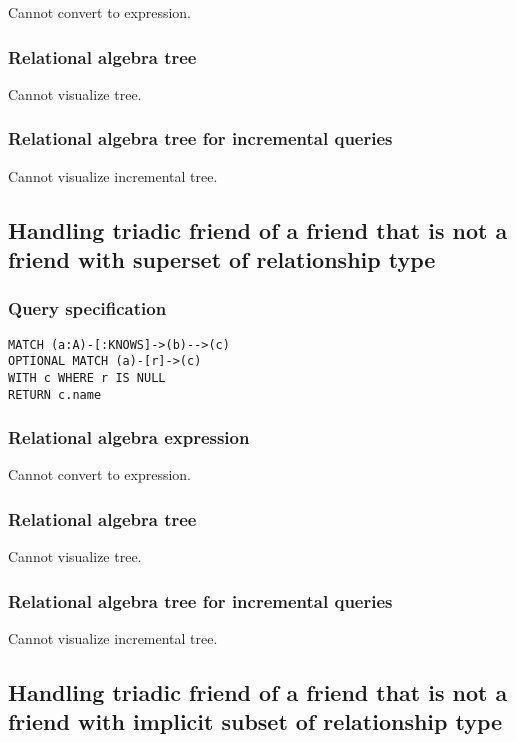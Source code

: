 Cannot convert to expression.

\subsubsection*{Relational algebra tree}

Cannot visualize tree.

\subsubsection*{Relational algebra tree for incremental queries}

Cannot visualize incremental tree.

\subsection{Handling triadic friend of a friend that is not a friend with superset of relationship type}

\subsubsection*{Query specification}

\begin{lstlisting}
MATCH (a:A)-[:KNOWS]->(b)-->(c)
OPTIONAL MATCH (a)-[r]->(c)
WITH c WHERE r IS NULL
RETURN c.name
\end{lstlisting}

\subsubsection*{Relational algebra expression}

Cannot convert to expression.

\subsubsection*{Relational algebra tree}

Cannot visualize tree.

\subsubsection*{Relational algebra tree for incremental queries}

Cannot visualize incremental tree.

\subsection{Handling triadic friend of a friend that is not a friend with implicit subset of relationship type}

